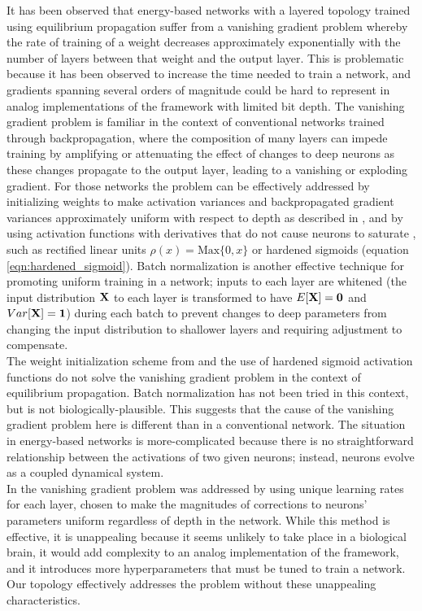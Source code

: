 \documentclass[format=sigconf]{acmart}
\newcommand{\npar}{\\\indent}
\begin{document}
It has been observed \cite{scellier17} that energy-based networks with a layered topology trained using equilibrium propagation suffer from a vanishing gradient problem whereby the rate of training of a weight decreases approximately exponentially with the number of layers between that weight and the output layer. This is problematic because it has been observed to increase the time needed to train a network, and gradients spanning several orders of magnitude could be hard to represent in analog implementations of the framework with limited bit depth. The vanishing gradient problem is familiar in the context of conventional networks trained through backpropagation, where the composition of many layers can impede training by amplifying or attenuating the effect of changes to deep neurons as these changes propagate to the output layer, leading to a vanishing or exploding gradient. For those networks the problem can be effectively addressed by initializing weights to make activation variances and backpropagated gradient variances approximately uniform with respect to depth as described in \cite{glorot2010}, and by using activation functions with derivatives that do not cause neurons to saturate \cite{schmidhuber2015}, such as rectified linear units $\rho(x)=\text{Max}\{0, x\}$ or hardened sigmoids (equation \ref{eqn:hardened_sigmoid}). Batch normalization \cite{ioffe2015} is another effective technique for promoting uniform training in a network; inputs to each layer are whitened (the input distribution $\bf{X}$ to each layer is transformed to have $E[\bf{X}]=0$ and $Var[\bf{X}]=1$) during each batch to prevent changes to deep parameters from changing the input distribution to shallower layers and requiring adjustment to compensate.
\npar
The weight initialization scheme from \cite{glorot2010} and the use of hardened sigmoid activation functions do not solve the vanishing gradient problem in the context of equilibrium propagation. Batch normalization has not been tried in this context, but is not biologically-plausible. This suggests that the cause of the vanishing gradient problem here is different than in a conventional network. The situation in energy-based networks is more-complicated because there is no straightforward relationship between the activations of two given neurons; instead, neurons evolve as a coupled dynamical system.
\npar
In \cite{scellier17} the vanishing gradient problem was addressed by using unique learning rates for each layer, chosen to make the magnitudes of corrections to neurons' parameters uniform regardless of depth in the network. While this method is effective, it is unappealing because it seems unlikely to take place in a biological brain, it would add complexity to an analog implementation of the framework, and it introduces more hyperparameters that must be tuned to train a network. Our topology effectively addresses the problem without these unappealing characteristics.
\end{document}
